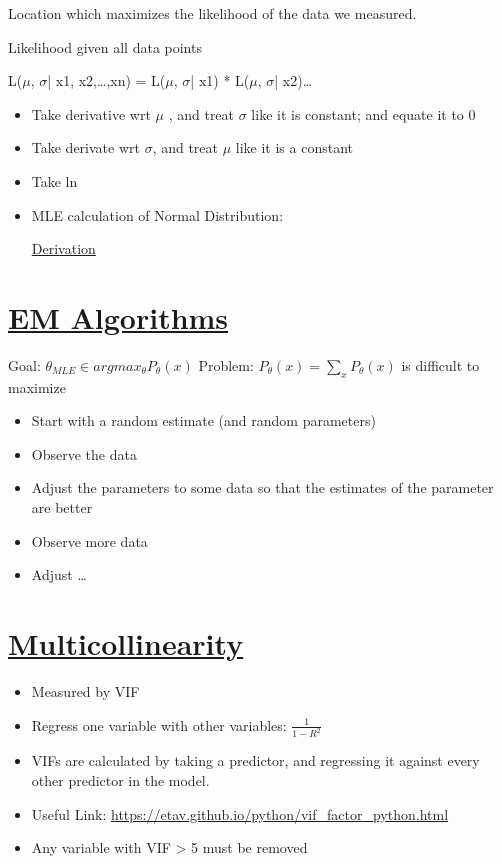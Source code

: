 \documentclass[11pt]{article}
\begin{document}
Location which maximizes the likelihood of the data we measured.


Likelihood given all data points

L(\(\mu\), \(\sigma\)| x1, x2,\ldots{},xn) =  L(\(\mu\), \(\sigma\)| x1) *  L(\(\mu\), \(\sigma\)| x2)\ldots{}

\begin{itemize}
\item Take derivative wrt \(\mu\) , and treat \(\sigma\) like it is constant; and equate it to 0
\item Take derivate wrt \(\sigma\), and treat \(\mu\) like it is a constant
\item Take ln
\item MLE calculation of Normal Distribution:

\href{./mle-normal-dist.pdf}{Derivation}
\end{itemize}

\section{\underline{EM Algorithms}}
\label{sec:org299290b}

Goal: \(\theta_{MLE} \in argmax_{\theta}P_{\theta}(x)\)
Problem: \(P_{\theta}(x) = \sum_{x} P_{\theta}(x)\) is difficult to maximize

\begin{itemize}
\item Start with a random estimate (and random parameters)
\item Observe the data
\item Adjust the parameters to some data so that the estimates of the parameter are better
\item Observe more data
\item Adjust \ldots{}
\end{itemize}

\section{\underline{Multicollinearity}}
\label{sec:org963d70b}

\begin{itemize}
\item Measured by VIF
\item Regress one variable with other variables: \(\frac{1}{1-R^{2}}\)
\item VIFs are calculated by taking a predictor, and regressing it against every other predictor in the model.
\item Useful Link: \url{https://etav.github.io/python/vif\_factor\_python.html}
\item Any variable with VIF > 5 must be removed
\end{itemize}
\end{document}
